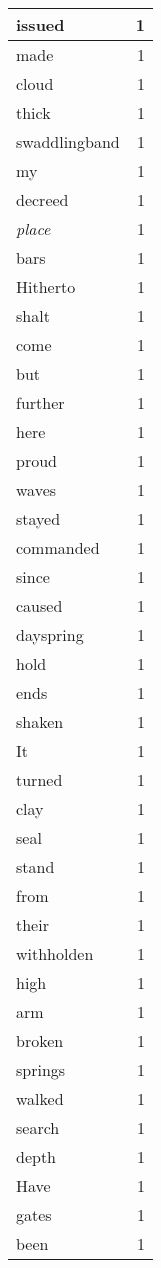\begin{center}
\begin{longtable}{l|r}
issued & 1 \\ \hline
made & 1 \\ \hline
cloud & 1 \\ \hline
thick & 1 \\ \hline
swaddlingband & 1 \\ \hline
my & 1 \\ \hline
decreed & 1 \\ \hline
\emph{place} & 1 \\ \hline
bars & 1 \\ \hline
Hitherto & 1 \\ \hline
shalt & 1 \\ \hline
come & 1 \\ \hline
but & 1 \\ \hline
further & 1 \\ \hline
here & 1 \\ \hline
proud & 1 \\ \hline
waves & 1 \\ \hline
stayed & 1 \\ \hline
commanded & 1 \\ \hline
since & 1 \\ \hline
caused & 1 \\ \hline
dayspring & 1 \\ \hline
hold & 1 \\ \hline
ends & 1 \\ \hline
shaken & 1 \\ \hline
It & 1 \\ \hline
turned & 1 \\ \hline
clay & 1 \\ \hline
seal & 1 \\ \hline
stand & 1 \\ \hline
from & 1 \\ \hline
their & 1 \\ \hline
withholden & 1 \\ \hline
high & 1 \\ \hline
arm & 1 \\ \hline
broken & 1 \\ \hline
springs & 1 \\ \hline
walked & 1 \\ \hline
search & 1 \\ \hline
depth & 1 \\ \hline
Have & 1 \\ \hline
gates & 1 \\ \hline
been & 1 \\ \hline

\end{longtable}
\end{center}
